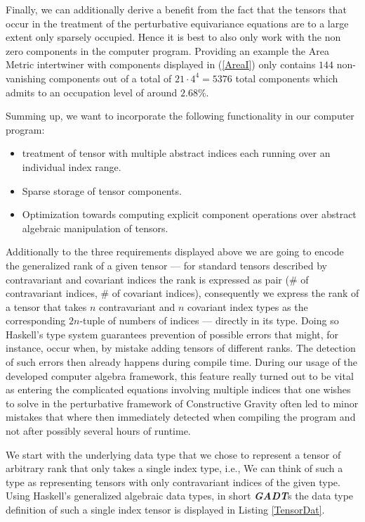 \documentclass[a4paper,12pt, DIV=14, BCOR=5mm, twoside, headsepline, numbers=noenddot]{scrbook}
\begin{document}
Finally, we can additionally derive a benefit from the fact that the tensors that occur in the treatment of the perturbative equivariance equations are to a large extent only sparsely occupied. Hence it is best to also only work with the non zero components in the computer program. Providing an example the Area Metric intertwiner with components displayed in (\ref{AreaI}) only contains $144$ non-vanishing components out of a total of $21 \cdot 4^4 = 5376$ total components which admits to an occupation level of around $2.68 \%$.

Summing up, we want to incorporate the following functionality in our computer program:
\begin{itemize}
    \item treatment of tensor with multiple abstract indices each running over an individual index range. 
    \item Sparse storage of tensor components.
    \item Optimization towards computing explicit component operations over abstract algebraic manipulation of tensors.
\end{itemize}

Additionally to the three requirements displayed above we are going to encode the generalized rank of a given tensor --- for standard tensors described by contravariant and covariant indices the rank is expressed as pair ($\#$ of contravariant indices, $\#$ of covariant indices), consequently we express the rank of a tensor that takes $n$ contravariant and $n$ covariant index types as the corresponding $2n$-tuple of numbers of indices --- directly in its type. Doing so Haskell's type system guarantees prevention of possible errors that might, for instance, occur when, by mistake adding tensors of different ranks. The detection of such errors then already happens during compile time. During our usage of the developed computer algebra framework, this feature really turned out to be vital as entering the complicated equations involving multiple indices that one wishes to solve in the perturbative framework of Constructive Gravity often led to minor mistakes that where then immediately detected when compiling the program and not after possibly several hours of runtime.

We start with the underlying data type that we chose to represent a tensor of arbitrary rank that only takes a single index type, i.e., We can think of such a type as representing tensors with only contravariant indices of the given type. Using Haskell's generalized algebraic data types, in short \textit{\textbf{GADT}}s the data type definition of such a single index tensor is displayed in Listing \ref{TensorDat}. 
\end{document}
